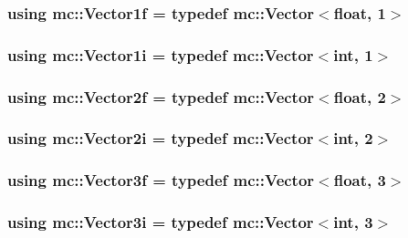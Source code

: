 \subsubsection[{\texorpdfstring{Vector1f}{Vector1f}}]{\setlength{\rightskip}{0pt plus 5cm}using {\bf mc\+::\+Vector1f} = typedef {\bf mc\+::\+Vector}$<$float, 1$>$}\hypertarget{namespacemc_a189909477b1267500c9b30cf606df884}{}\label{namespacemc_a189909477b1267500c9b30cf606df884}
\subsubsection[{\texorpdfstring{Vector1i}{Vector1i}}]{\setlength{\rightskip}{0pt plus 5cm}using {\bf mc\+::\+Vector1i} = typedef {\bf mc\+::\+Vector}$<${\bf int}, 1$>$}\hypertarget{namespacemc_a6be7455b4341d989d713cfd9387b47ed}{}\label{namespacemc_a6be7455b4341d989d713cfd9387b47ed}
\subsubsection[{\texorpdfstring{Vector2f}{Vector2f}}]{\setlength{\rightskip}{0pt plus 5cm}using {\bf mc\+::\+Vector2f} = typedef {\bf mc\+::\+Vector}$<$float, 2$>$}\hypertarget{namespacemc_a58c645c7ce4d8e1b71ae618f37f8a162}{}\label{namespacemc_a58c645c7ce4d8e1b71ae618f37f8a162}
\subsubsection[{\texorpdfstring{Vector2i}{Vector2i}}]{\setlength{\rightskip}{0pt plus 5cm}using {\bf mc\+::\+Vector2i} = typedef {\bf mc\+::\+Vector}$<${\bf int}, 2$>$}\hypertarget{namespacemc_a9d370d4e850e128d4c7ca446fd785a0d}{}\label{namespacemc_a9d370d4e850e128d4c7ca446fd785a0d}
\subsubsection[{\texorpdfstring{Vector3f}{Vector3f}}]{\setlength{\rightskip}{0pt plus 5cm}using {\bf mc\+::\+Vector3f} = typedef {\bf mc\+::\+Vector}$<$float, 3$>$}\hypertarget{namespacemc_ae4429bda568885c31776f449138faba0}{}\label{namespacemc_ae4429bda568885c31776f449138faba0}
\subsubsection[{\texorpdfstring{Vector3i}{Vector3i}}]{\setlength{\rightskip}{0pt plus 5cm}using {\bf mc\+::\+Vector3i} = typedef {\bf mc\+::\+Vector}$<${\bf int}, 3$>$}\hypertarget{namespacemc_a4d62b05faba771617b95b5b75b6f15c3}{}\label{namespacemc_a4d62b05faba771617b95b5b75b6f15c3}
